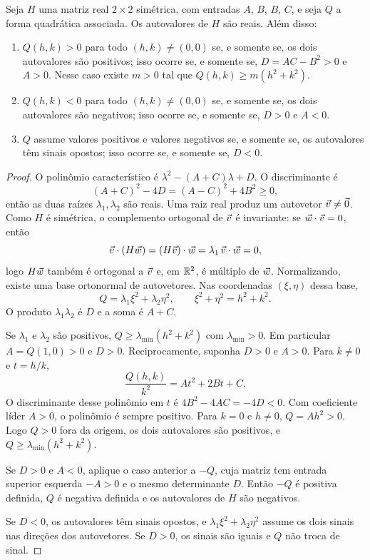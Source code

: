 \documentclass[11pt,a4paper]{article}
\begin{document}
\begin{teorema}
Seja $H$ uma matriz real $2\times 2$ simétrica, com entradas $A$, $B$, $B$, $C$, e seja $Q$ a forma quadrática associada. Os autovalores de $H$ são reais. Além disso:
\begin{enumerate}[leftmargin=1.4em]
\item $Q(h,k)>0$ para todo $(h,k)\neq(0,0)$ se, e somente se, os dois autovalores são positivos; isso ocorre se, e somente se, $D=AC-B^2>0$ e $A>0$. Nesse caso existe $m>0$ tal que $Q(h,k)\ge m(h^2+k^2)$.
\item $Q(h,k)<0$ para todo $(h,k)\neq(0,0)$ se, e somente se, os dois autovalores são negativos; isso ocorre se, e somente se, $D>0$ e $A<0$.
\item $Q$ assume valores positivos e valores negativos se, e somente se, os autovalores têm sinais opostos; isso ocorre se, e somente se, $D<0$.
\end{enumerate}
\end{teorema}

\begin{proof}
O polinômio característico é $\lambda^2-(A+C)\lambda+D$. O discriminante é
\[
(A+C)^2-4D=(A-C)^2+4B^2\ge 0,
\]
então as duas raízes $\lambda_1,\lambda_2$ são reais. Uma raiz real produz um autovetor $\vec{v}\neq\vec{0}$. Como $H$ é simétrica, o complemento ortogonal de $\vec{v}$ é invariante: se $\vec{w}\cdot\vec{v}=0$, então
\[
\vec{v}\cdot(H\vec{w})=(H\vec{v})\cdot\vec{w}=\lambda_1\,\vec{v}\cdot\vec{w}=0,
\]
logo $H\vec{w}$ também é ortogonal a $\vec{v}$ e, em $\mathbb{R}^2$, é múltiplo de $\vec{w}$. Normalizando, existe uma base ortonormal de autovetores. Nas coordenadas $(\xi,\eta)$ dessa base,
\[
Q=\lambda_1\xi^2+\lambda_2\eta^2,\qquad \xi^2+\eta^2=h^2+k^2.
\]
O produto $\lambda_1\lambda_2$ é $D$ e a soma é $A+C$.

Se $\lambda_1$ e $\lambda_2$ são positivos, $Q\ge\lambda_{\min}(h^2+k^2)$ com $\lambda_{\min}>0$. Em particular $A=Q(1,0)>0$ e $D>0$. Reciprocamente, suponha $D>0$ e $A>0$. Para $k\neq 0$ e $t=h/k$,
\[
\frac{Q(h,k)}{k^2}=At^2+2Bt+C.
\]
O discriminante desse polinômio em $t$ é $4B^2-4AC=-4D<0$. Com coeficiente líder $A>0$, o polinômio é sempre positivo. Para $k=0$ e $h\neq 0$, $Q=Ah^2>0$. Logo $Q>0$ fora da origem, os dois autovalores são positivos, e $Q\ge\lambda_{\min}(h^2+k^2)$.

Se $D>0$ e $A<0$, aplique o caso anterior a $-Q$, cuja matriz tem entrada superior esquerda $-A>0$ e o mesmo determinante $D$. Então $-Q$ é positiva definida, $Q$ é negativa definida e os autovalores de $H$ são negativos.

Se $D<0$, os autovalores têm sinais opostos, e $\lambda_1\xi^2+\lambda_2\eta^2$ assume os dois sinais nas direções dos autovetores. Se $D>0$, os sinais são iguais e $Q$ não troca de sinal.
\end{proof}
\end{document}
